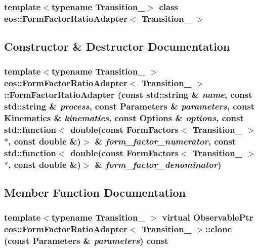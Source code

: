 \subsubsection*{template$<$typename Transition\_\-$>$ class eos::FormFactorRatioAdapter$<$ Transition\_\- $>$}



\subsection{Constructor \& Destructor Documentation}
\hypertarget{classeos_1_1FormFactorRatioAdapter_aabe5ff6acb4c2411a9dcc17b0c8058db}{
\subsubsection[{FormFactorRatioAdapter}]{\setlength{\rightskip}{0pt plus 5cm}template$<$typename Transition\_\- $>$ {\bf eos::FormFactorRatioAdapter}$<$ Transition\_\- $>$::{\bf FormFactorRatioAdapter} (const std::string \& {\em name}, \/  const std::string \& {\em process}, \/  const {\bf Parameters} \& {\em parameters}, \/  const {\bf Kinematics} \& {\em kinematics}, \/  const {\bf Options} \& {\em options}, \/  const std::function$<$ double(const FormFactors$<$ Transition\_\- $>$ $\ast$, const double \&)$>$ \& {\em form\_\-factor\_\-numerator}, \/  const std::function$<$ double(const FormFactors$<$ Transition\_\- $>$ $\ast$, const double \&)$>$ \& {\em form\_\-factor\_\-denominator})}}
\label{classeos_1_1FormFactorRatioAdapter_aabe5ff6acb4c2411a9dcc17b0c8058db}


\subsection{Member Function Documentation}
\hypertarget{classeos_1_1FormFactorRatioAdapter_ad8de46a9cedc903bfe0beecbbf66dc58}{
\subsubsection[{clone}]{\setlength{\rightskip}{0pt plus 5cm}template$<$typename Transition\_\- $>$ virtual {\bf ObservablePtr} {\bf eos::FormFactorRatioAdapter}$<$ Transition\_\- $>$::clone (const {\bf Parameters} \& {\em parameters}) const}}
\label{classeos_1_1FormFactorRatioAdapter_ad8de46a9cedc903bfe0beecbbf66dc58}


